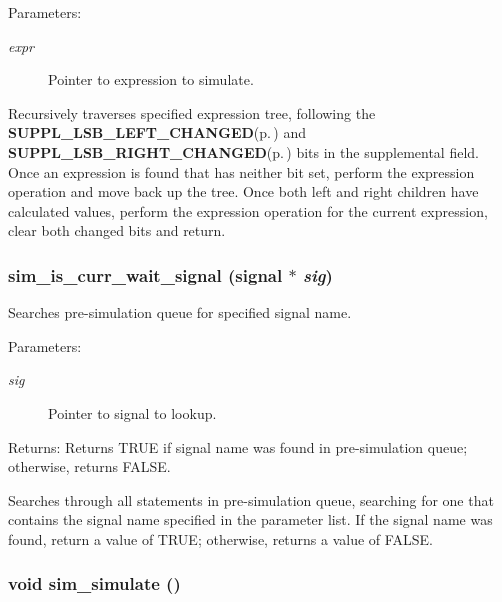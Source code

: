 \begin{Desc}
\item[Parameters:]
\begin{description}
\item[{\em expr}]Pointer to expression to simulate.\end{description}
\end{Desc}
Recursively traverses specified expression tree, following the {\bf SUPPL\_\-LSB\_\-LEFT\_\-CHANGED}{\rm (p.\,\pageref{group__expr__suppl_a9})} and {\bf SUPPL\_\-LSB\_\-RIGHT\_\-CHANGED}{\rm (p.\,\pageref{group__expr__suppl_a10})} bits in the supplemental field. Once an expression is found that has neither bit set, perform the expression operation and move back up the tree. Once both left and right children have calculated values, perform the expression operation for the current expression, clear both changed bits and return. 
\subsubsection{ sim\_\-is\_\-curr\_\-wait\_\-signal ({\bf signal} $\ast$ {\em sig})}\label{sim_8c_a7}


Searches pre-simulation queue for specified signal name. 

\begin{Desc}
\item[Parameters:]
\begin{description}
\item[{\em sig}]Pointer to signal to lookup.\end{description}
\end{Desc}
\begin{Desc}
\item[Returns:]Returns TRUE if signal name was found in pre-simulation queue; otherwise, returns FALSE.\end{Desc}
Searches through all statements in pre-simulation queue, searching for one that contains the signal name specified in the parameter list. If the signal name was found, return a value of TRUE; otherwise, returns a value of FALSE. 
\subsubsection{\setlength{\rightskip}{0pt plus 5cm}void sim\_\-simulate ()}\label{sim_8c_a11}



